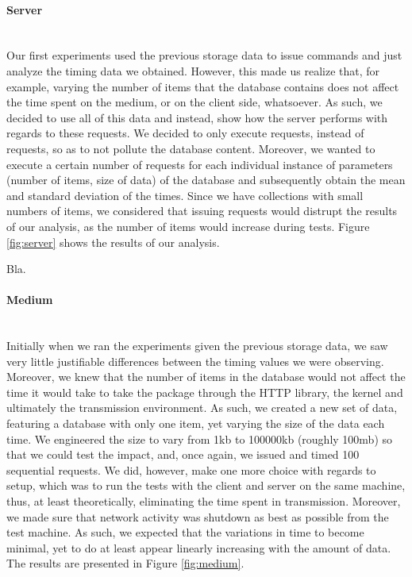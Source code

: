 \paragraph{Server} ~\\
Our first experiments used the previous storage data to issue  commands and just analyze the timing data we obtained.
However, this made us realize that, for example, varying the number of items that the database contains does not affect the time spent on the medium, or on the client side, whatsoever.
As such, we decided to use all of this data and instead, show how the server performs with regards to these requests.
We decided to only execute  requests, instead of  requests, so as to not pollute the database content.
Moreover, we wanted to execute a certain number of requests for each individual instance of parameters (number of items, size of data) of the database and subsequently obtain the mean and standard deviation of the times.
Since we have collections with small numbers of items, we considered that issuing  requests would distrupt the results of our analysis, as the number of items would increase during tests.
Figure \ref{fig:server} shows the results of our analysis.

Bla.\label{fig:server}

\paragraph{Medium} ~\\
Initially when we ran the experiments given the previous storage data, we saw very little justifiable differences between the timing values we were observing.
Moreover, we knew that the number of items in the database would not affect the time it would take to take the package through the HTTP library, the kernel and ultimately the transmission environment.
As such, we created a new set of data, featuring a database with only one item, yet varying the size of the data each time.
We engineered the size to vary from 1kb to 100000kb (roughly 100mb) so that we could test the impact, and, once again, we issued and timed 100 sequential  requests.
We did, however, make one more choice with regards to setup, which was to run the tests with the client and server on the same machine, thus, at least theoretically, eliminating the time spent in transmission.
Moreover, we made sure that network activity was shutdown as best as possible from the test machine.
As such, we expected that the variations in time to become minimal, yet to do at least appear linearly increasing with the amount of data.
The results are presented in Figure \ref{fig:medium}.

